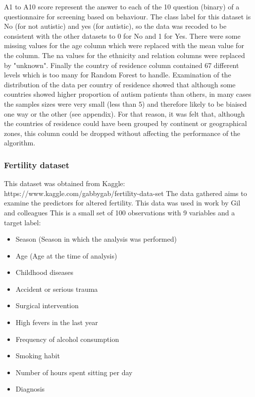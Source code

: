 A1 to A10 score represent the answer to each of the 10 question (binary) of a questionnaire for screening based on behaviour. 
The class label for this dataset is No (for not autistic) and yes (for autistic), so the data was recoded to be consistent with the other datasets to 0 for No and 1 for Yes.
There were some missing values for the age column which were replaced with the mean value for the column. The na values for the ethnicity and relation columns were replaced by "unknown". Finally the country of residence column contained 67 different levels which is too many for Random Forest to handle.  Examination of the distribution of the data per country of residence showed that although some countries showed higher proportion of autism patients than others, in many cases the samples sizes were very small (less than 5) and therefore likely to be biaised one way or the other (see appendix). For that reason, it was felt that, although the countries of residence could have been grouped by continent or geographical zones, this column could be dropped without affecting the performance of the algorithm. 

\subsubsection{Fertility dataset}
This dataset was obtained from Kaggle:\newline
https://www.kaggle.com/gabbygab/fertility-data-set \newline
The data gathered aims to examine the predictors for altered fertility. This data was used in work by Gil and colleagues \citep{} This is a small set of 100 observations with 9 variables and a target label:
\begin{itemize}
    \item Season (Season in which the analysis was performed)
    \item Age (Age at the time of analysis)
    \item Childhood diseases
    \item Accident or serious trauma
    \item Surgical intervention
    \item High fevers in the last year
    \item Frequency of alcohol consumption
    \item Smoking habit
    \item Number of hours spent sitting per day
    \item Diagnosis
\end{itemize}

